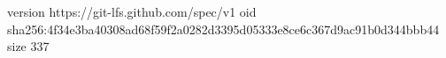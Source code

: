 version https://git-lfs.github.com/spec/v1
oid sha256:4f34e3ba40308ad68f59f2a0282d3395d05333e8ce6c367d9ac91b0d344bbb44
size 337
